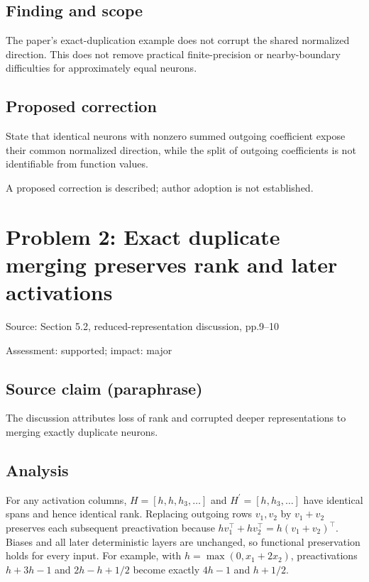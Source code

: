 \documentclass[11pt]{article}
\begin{document}
\subsection*{Finding and scope}

The paper’s exact-duplication example does not corrupt the shared normalized direction. This does not remove practical finite-precision or nearby-boundary difficulties for approximately equal neurons.

\subsection*{Proposed correction}

State that identical neurons with nonzero summed outgoing coefficient expose their common normalized direction, while the split of outgoing coefficients is not identifiable from function values.

A proposed correction is described; author adoption is not established.

\section*{Problem 2: Exact duplicate merging preserves rank and later activations}

Source: Section 5.2, reduced-representation discussion, pp.9–10

Assessment: supported; impact: major

\subsection*{Source claim (paraphrase)}

The discussion attributes loss of rank and corrupted deeper representations to merging exactly duplicate neurons.

\subsection*{Analysis}

For any activation columns, \(H=[h,h,h_3,\ldots]\) and \(H^{\prime}=[h,h_3,\ldots]\) have identical spans and hence identical rank. Replacing outgoing rows \(v_1,v_2\) by \(v_1+v_2\) preserves each subsequent preactivation because \(hv_1^{\top}+hv_2^{\top}=h(v_1+v_2)^{\top}\). Biases and all later deterministic layers are unchanged, so functional preservation holds for every input. For example, with \(h=\max(0,x_1+2x_2)\), preactivations \(h+3h-1\) and \(2h-h+1/2\) become exactly \(4h-1\) and \(h+1/2\).
\end{document}
